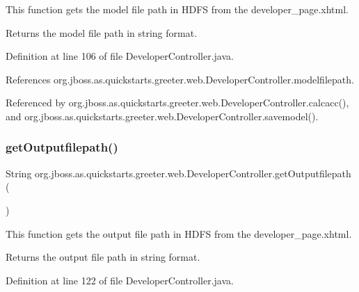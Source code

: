 This function gets the model file path in H\+D\+FS from the developer\+\_\+page.\+xhtml. 

\begin{DoxyReturn}{Returns}
the model file path in string format. 
\end{DoxyReturn}


Definition at line 106 of file Developer\+Controller.\+java.



References org.\+jboss.\+as.\+quickstarts.\+greeter.\+web.\+Developer\+Controller.\+modelfilepath.



Referenced by org.\+jboss.\+as.\+quickstarts.\+greeter.\+web.\+Developer\+Controller.\+calcacc(), and org.\+jboss.\+as.\+quickstarts.\+greeter.\+web.\+Developer\+Controller.\+savemodel().

\mbox{\label{classorg_1_1jboss_1_1as_1_1quickstarts_1_1greeter_1_1web_1_1_developer_controller_afb7be03bf898a7f7162be156b524d42c}} 
\subsubsection{\texorpdfstring{get\+Outputfilepath()}{getOutputfilepath()}}
{\footnotesize\ttfamily String org.\+jboss.\+as.\+quickstarts.\+greeter.\+web.\+Developer\+Controller.\+get\+Outputfilepath (\begin{DoxyParamCaption}{ }\end{DoxyParamCaption})}



This function gets the output file path in H\+D\+FS from the developer\+\_\+page.\+xhtml. 

\begin{DoxyReturn}{Returns}
the output file path in string format. 
\end{DoxyReturn}


Definition at line 122 of file Developer\+Controller.\+java.



